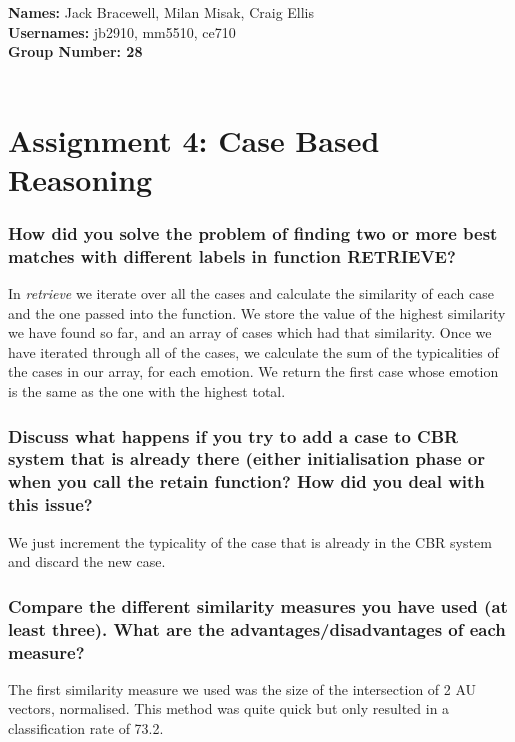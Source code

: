 \documentclass[12pt]{article}
\begin{document}
{\bf Names:} Jack Bracewell, Milan Misak, Craig Ellis \\
{\bf Usernames:} jb2910, mm5510, ce710 \\
{\bf Group Number: 28}  \\ \\

\section*{Assignment 4: Case Based Reasoning}

\subsubsection*{How did you solve the problem of finding two or more best matches with different labels in function RETRIEVE?}

In \emph{retrieve} we iterate over all the cases and calculate the similarity of each case and the one passed into the function. We store the value of the highest similarity we have found so far, and an array of cases which had that similarity. Once we have iterated through all of the cases, we calculate the sum of the typicalities of the cases in our array, for each emotion. We return the first case whose emotion is the same as the one with the highest total. \\

\subsubsection*{Discuss what happens if you try to add a case to CBR system that is already there (either initialisation phase or when you call the retain function? How did you deal with this issue?}

We just increment the typicality of the case that is already in the CBR system and discard the new case. 

\subsubsection*{Compare the different similarity measures you have used (at least three). What are the advantages/disadvantages of each measure?}

The first similarity measure we used was the size of the intersection of 2 AU vectors, normalised. This method was quite quick but only resulted in a classification rate of 73.2. \\ 
\end{document}
